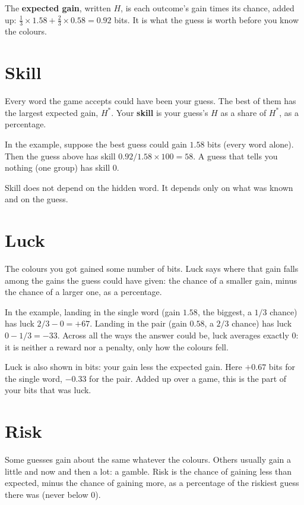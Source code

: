 \documentclass[11pt]{article}
\begin{document}
The \textbf{expected gain}, written $H$, is each outcome's gain times its chance, added up:
$\tfrac13\times1.58+\tfrac23\times0.58=0.92$ bits. It is what the guess is worth before you know
the colours.

\section{Skill}\label{sec:skill}

Every word the game accepts could have been your guess. The best of them has the largest expected
gain, $H^*$. Your \textbf{skill} is your guess's $H$ as a share of $H^*$, as a percentage.

In the example, suppose the best guess could gain $1.58$ bits (every word alone). Then the guess
above has skill $0.92/1.58\times100=58$. A guess that tells you nothing (one group) has skill 0.

Skill does not depend on the hidden word. It depends only on what was known and on the guess.

\section{Luck}\label{sec:luck}

The colours you got gained some number of bits. Luck says where that gain falls among the gains the
guess could have given: the chance of a smaller gain, minus the chance of a larger one, as a
percentage.

In the example, landing in the single word (gain $1.58$, the biggest, a $1/3$ chance) has luck
$2/3-0=+67$. Landing in the pair (gain $0.58$, a $2/3$ chance) has luck $0-1/3=-33$. Across all the
ways the answer could be, luck averages exactly 0: it is neither a reward nor a penalty, only how
the colours fell.

Luck is also shown in bits: your gain less the expected gain. Here $+0.67$ bits for the single
word, $-0.33$ for the pair. Added up over a game, this is the part of your bits that was luck.

\section{Risk}\label{sec:risk}

Some guesses gain about the same whatever the colours. Others usually gain a little and now and
then a lot: a gamble. Risk is the chance of gaining less than expected, minus the chance of gaining
more, as a percentage of the riskiest guess there was (never below 0).
\end{document}
